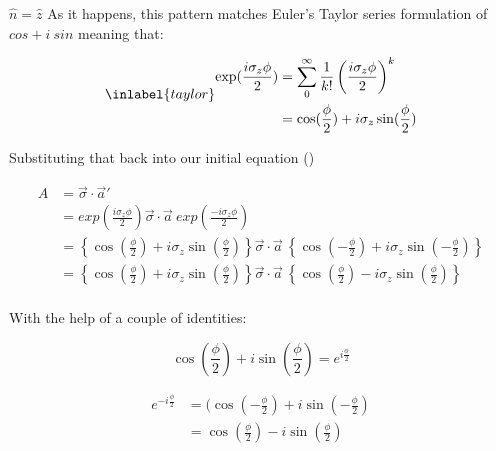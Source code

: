 \begin{answer}
\begin{answerpart}{\texorpdfstring{$\hat{n} = \hat{z}$}{n = z}}
    As it happens, this pattern matches Euler's Taylor series formulation
    of $cos + i\ sin$ meaning that:

    \begin{equation}
      \inlabel{taylor}
      \begin{split}
        \exp(\frac{i\sigma_z\phi}{2})
        &= \sum_{0}^{\infty}{\frac{1}{k!}\left(\frac{i\sigma_z\phi}{2}\right)^k}
        \\
        &= \cos(\frac \phi 2) + i \sigma_z \sin(\frac \phi 2)
        \\
      \end{split}
    \end{equation}

    Substituting that back into our initial equation ()

    \begin{equation}
      \begin{split}
        A &=
        \vec{\sigma} \cdot \vec{a}' \\
        &= exp \left( \frac{i\sigma_z\phi}{2}\right)
        \vec{\sigma} \cdot \vec{a} \ 
        exp \left( \frac{-i\sigma_z\phi}{2}\right)\\
        &= \left\{ \cos(\frac \phi 2) + i \sigma_z \sin(\frac \phi 2) \right\}
        \vec{\sigma} \cdot \vec{a} \ 
        \left\{ \cos(-\frac \phi 2) + i \sigma_z \sin(-\frac \phi 2) \right\}\\
        &= \left\{ \cos(\frac \phi 2) + i \sigma_z \sin(\frac \phi 2) \right\}
        \vec{\sigma} \cdot \vec{a} \ 
        \left\{ \cos(\frac \phi 2) - i \sigma_z \sin(\frac \phi 2) \right\}\\
      \end{split}
    \end{equation}

    With the help of a couple of identities:

    \begin{equation}
      \cos(\frac \phi 2) + i\sin(\frac \phi 2) = e^{i \tfrac \phi 2}
    \end{equation}

    \begin{equation}
      \begin{split}
        e^{-i \tfrac \phi 2}
        &= (\cos(-\frac \phi 2) + i\sin(-\frac \phi 2) \\
        &= \cos(\frac \phi 2) - i\sin(\frac \phi 2) \\
      \end{split}
    \end{equation}


\end{answerpart}
\end{answer}
